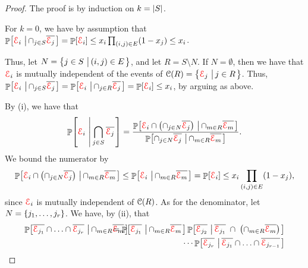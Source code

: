 \begin{proof}
    The proof is by induction on $k = \left| {S} \right|$.

    For $k = 0$, we have by assumption that $\Prob{\Event_i \sep{ \cap_{j
             \in S} \overline{\Event_j}}} = \Prob{\Event_i } \leq x_i
    \prod_{(i,j) \in E} \pth{1-x_j} \leq x_i$.
    
    Thus, let $N = \left\{ { j \in S \,\left|\, { (i,j) \in E} \bigr.\right.} \right\}$, and
    let $R = S \setminus N$. If $N = \emptyset$, then we
    have that ${\textcolor{red}{\EuScript{E}}}_i$ is mutually independent of the events of
    $\EuScript{C}(R) = \left\{ {{\textcolor{red}{\EuScript{E}}}_j \,\left|\, { j \in R} \bigr.\right.} \right\}$.  Thus, $\Prob{\Event_i
       \sep{ \cap_{j \in S} \overline{\Event_j}}} = \Prob{\Event_i
       \sep{ \cap_{j \in R} \overline{\Event_j}}} = \Prob{\Event_i}
    \leq x_i$, by arguing as above.
    
    By  (i), we have that    
    \begin{align*}
    \Prob{\Event_i \sep{\bigcap_{j \in S} \overline{\Event_j}}} =
    \frac{\Prob{\Event_i \cap \pth{ \cap_{j \in N}
             \overline{\Event_j} } \sep{ \cap_{m \in R}
             \overline{\Event_m}}}} {\Prob{\cap_{j \in
             N}\overline{\Event_j} \sep{ \cap_{m \in R}
             \overline{\Event_m}} }}.
    \end{align*}
    We bound the numerator by
    \begin{align*}
    \Prob{\Event_i \cap \pth{ \cap_{j \in N} \overline{\Event_j} }
       \sep{ \cap_{m \in R} \overline{\Event_m}}} \leq \Prob{\Event_i
       \sep{ \cap_{m \in R} \overline{\Event_m}}} = \Prob{\Event_i}
    \leq x_i \prod_{(i,j) \in E} \pth{1-x_j},
    \end{align*}   
    since ${\textcolor{red}{\EuScript{E}}}_i$ is mutually independent of $\EuScript{C}(R)$. As for
    the denominator, let $N=\left\{ {j_1, \ldots, j_r} \right\}$. We have, by
     (ii), that
    \begin{eqnarray*}
        \Prob{ \overline{\Event_{j_1}} \cap \ldots \cap
           \overline{\Event_{j_r}} \sep{ \cap_{m \in R}
              \overline{\Event_m}}} \hspace{-4cm}&&\hspace{3.0cm}= 
        \Prob{\overline{\Event_{j_1}} \sep{
              \cap_{m \in R} \overline{\Event_m}}}
        \Prob{\overline{\Event_{j_2}} \sep{ \overline{\Event_{j_1}} \;\cap\;
              \pth{ \cap_{m \in R} \overline{\Event_m}}}} \\
        &&\cdots 
        \Prob{\overline{\Event_{j_r}} \sep{ \overline{\Event_{j_1}} \cap
              \ldots \cap \overline{\Event_{j_{r-1}}}
}}
\end{eqnarray*}
\end{proof}
